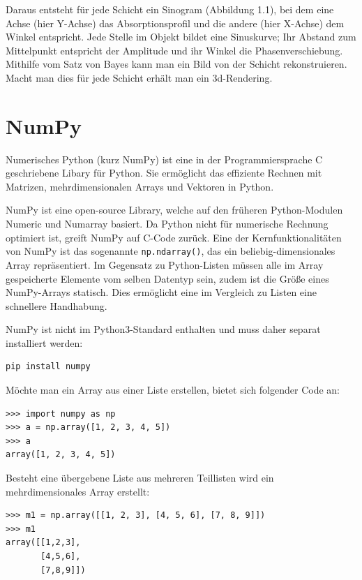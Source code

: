 \documentclass[]{dsadokumentation}
\begin{document}
Daraus entsteht für jede Schicht ein Sinogram (Abbildung 1.1), bei dem eine Achse (hier Y-Achse) das Absorptionsprofil und die andere (hier X-Achse) dem Winkel entspricht. Jede Stelle im Objekt bildet eine Sinuskurve; Ihr Abstand zum Mittelpunkt entspricht der Amplitude und ihr Winkel die Phasenverschiebung. Mithilfe vom Satz von Bayes kann man ein Bild von der Schicht rekonstruieren. Macht man dies für jede Schicht erhält man ein 3d-Rendering.

\section{NumPy}\label{k4.2.ch.NumPy}

Numerisches Python (kurz NumPy) ist eine in der Programmiersprache C geschriebene Libary für Python. Sie ermöglicht das effiziente Rechnen mit Matrizen, mehrdimensionalen Arrays und Vektoren in Python.

NumPy ist eine open-source Library, welche auf den früheren Python-Modulen Numeric und Numarray basiert. Da Python nicht für numerische Rechnung optimiert ist, greift NumPy auf C-Code zurück. Eine der Kernfunktionalitäten von NumPy ist das sogenannte \verb|np.ndarray()|, das ein beliebig-dimensionales Array repräsentiert. Im Gegensatz zu Python-Listen müssen alle im Array gespeicherte Elemente vom selben Datentyp sein, zudem ist die Größe eines NumPy-Arrays statisch. Dies ermöglicht eine im Vergleich zu Listen eine schnellere Handhabung.

NumPy ist nicht im Python3-Standard enthalten und muss daher separat installiert werden:


\begin{verbatim}
pip install numpy
\end{verbatim}

Möchte man ein Array aus einer Liste erstellen, bietet sich folgender Code an:

\begin{verbatim}
>>> import numpy as np
>>> a = np.array([1, 2, 3, 4, 5])
>>> a
array([1, 2, 3, 4, 5])
\end{verbatim}

Besteht eine übergebene Liste aus mehreren Teillisten wird ein mehrdimensionales Array erstellt:

\begin{verbatim}
>>> m1 = np.array([[1, 2, 3], [4, 5, 6], [7, 8, 9]])
>>> m1
array([[1,2,3],
       [4,5,6],
       [7,8,9]])
\end{verbatim}
\end{document}
